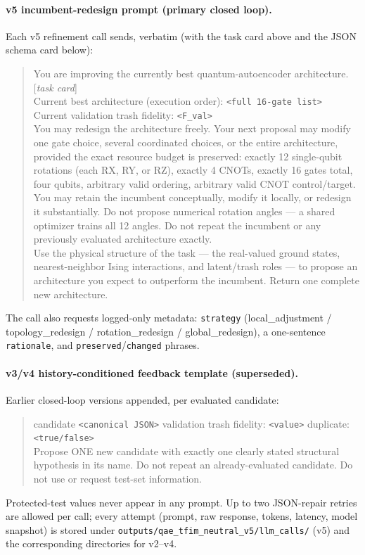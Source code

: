 \documentclass[11pt]{article}
\begin{document}
\paragraph{v5 incumbent-redesign prompt (primary closed loop).}
Each v5 refinement call sends, verbatim (with the task card above and the JSON schema card below):
\begin{quote}\small
You are improving the currently best quantum-autoencoder architecture. [\emph{task card}]\\
Current best architecture (execution order): \texttt{<full 16-gate list>}\\
Current validation trash fidelity: \texttt{<F\_val>}\\
You may redesign the architecture freely. Your next proposal may modify one gate choice, several coordinated choices, or the entire architecture, provided the exact resource budget is preserved: exactly 12 single-qubit rotations (each RX, RY, or RZ), exactly 4 CNOTs, exactly 16 gates total, four qubits, arbitrary valid ordering, arbitrary valid CNOT control/target. You may retain the incumbent conceptually, modify it locally, or redesign it substantially. Do not propose numerical rotation angles --- a shared optimizer trains all 12 angles. Do not repeat the incumbent or any previously evaluated architecture exactly.\\
Use the physical structure of the task --- the real-valued ground states, nearest-neighbor Ising interactions, and latent/trash roles --- to propose an architecture you expect to outperform the incumbent. Return one complete new architecture.
\end{quote}
The call also requests logged-only metadata: \texttt{strategy} (local\_adjustment / topology\_redesign / rotation\_redesign / global\_redesign), a one-sentence \texttt{rationale}, and \texttt{preserved}/\texttt{changed} phrases.

\paragraph{v3/v4 history-conditioned feedback template (superseded).}
Earlier closed-loop versions appended, per evaluated candidate:
\begin{quote}\small
candidate \texttt{<canonical JSON>} validation trash fidelity: \texttt{<value>} duplicate: \texttt{<true/false>}\\
Propose ONE new candidate with exactly one clearly stated structural hypothesis in its name. Do not repeat an already-evaluated candidate. Do not use or request test-set information.
\end{quote}
Protected-test values never appear in any prompt.
Up to two JSON-repair retries are allowed per call; every attempt (prompt, raw response, tokens, latency, model snapshot) is stored under \texttt{outputs/qae\_tfim\_neutral\_v5/llm\_calls/} (v5) and the corresponding directories for v2--v4.
\end{document}
